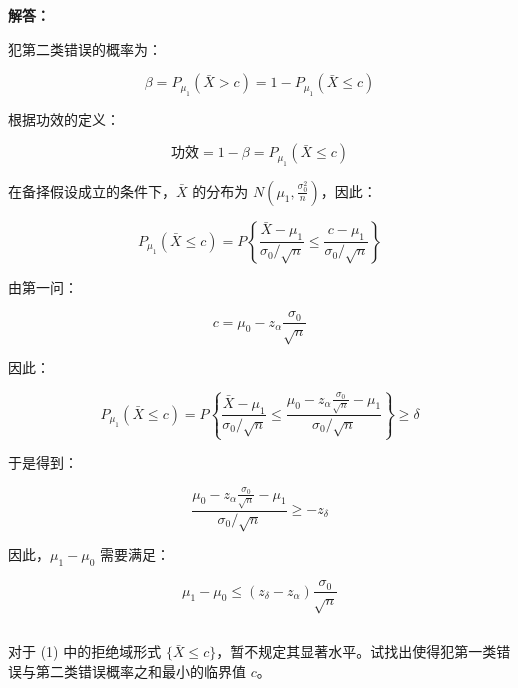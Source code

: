 \documentclass[12pt,a4paper]{article}
\begin{document}
\begin{answerbox}
\textbf{解答：}

犯第二类错误的概率为：

$$
\beta = P_{\mu_1}\left(\bar{X} > c\right) = 1 - P_{\mu_1}\left(\bar{X} \leq c\right)
$$

根据功效的定义：

$$
\text{功效} = 1-\beta = P_{\mu_1}\left(\bar{X} \leq c\right)
$$

在备择假设成立的条件下，$\bar{X}$ 的分布为 $N\left(\mu_1, \frac{\sigma_0^2}{n}\right)$，因此：

$$
P_{\mu_1}\left(\bar{X} \leq c\right) = P\left\{\frac{\bar{X}-\mu_1}{\sigma_0/\sqrt{n}} \leq \frac{c-\mu_1}{\sigma_0/\sqrt{n}}\right\}
$$

由第一问：

$$
c = \mu_0 - z_{\alpha} \frac{\sigma_0}{\sqrt{n}}
$$

因此：

$$
P_{\mu_1}\left(\bar{X} \leq c\right) = P\left\{\frac{\bar{X}-\mu_1}{\sigma_0/\sqrt{n}} \leq \frac{\mu_0 - z_{\alpha} \frac{\sigma_0}{\sqrt{n}} - \mu_1}{\sigma_0/\sqrt{n}}\right\} \geq \delta
$$

于是得到：

$$
\frac{\mu_0 - z_{\alpha} \frac{\sigma_0}{\sqrt{n}} - \mu_1}{\sigma_0/\sqrt{n}} \geq -z_{\delta}
$$

因此，$\mu_1-\mu_0$ 需要满足：

$$
\mu_1 - \mu_0 \leq (z_{\delta} - z_{\alpha}) \frac{\sigma_0}{\sqrt{n}}
$$
\end{answerbox}

\subsection{}

对于 (1) 中的拒绝域形式 $\{\bar X \le c\}$，暂不规定其显著水平。试找出使得犯第一类错误与第二类错误概率之和最小的临界值 $c$。
\end{document}
